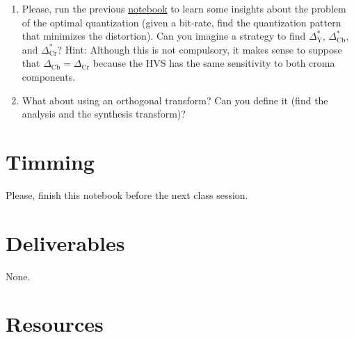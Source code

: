\begin{enumerate}
\item Please, run the previous
  \href{https://github.com/Sistemas-Multimedia/Sistemas-Multimedia.github.io/blob/master/study_guide/06-color_transform/performance.ipynb}{notebook}
  to learn some insights about the problem of the optimal quantization
  (given a bit-rate, find the quantization pattern that minimizes the
  distortion). Can you imagine a strategy to find
  $\Delta^*_{\text{Y}}$, $\Delta^*_{\text{Cb}}$, and
  $\Delta^*_{\text{Cr}}$? Hint: Although this is not compulsory, it
  makes sense to suppose that
  $\Delta_{\text{Cb}} = \Delta_{\text{Cr}}$ because the HVS has the
  same sensitivity to both croma components.
\item What about using an orthogonal transform? Can you define it
  (find the analysis and the synthesis transform)?
\end{enumerate}
\section{Timming}

Please, finish this notebook before the next class session.

\section{Deliverables}

None.

\section{Resources}


